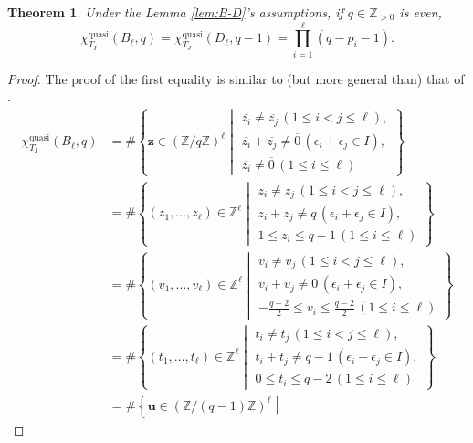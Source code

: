 \documentclass[12pt]{amsart}
\theoremstyle{plain}
\newtheorem{theorem}{Theorem}[section]
\theoremstyle{definition}
\theoremstyle{remark}
\newcommand{\Z}{\mathbb{Z}}
\newcommand{\quasi}{\operatorname{quasi}}
\begin{document}
\begin{theorem} \label{thm:B-and-D} 
Under the Lemma \ref{lem:B-D}'s assumptions, if $q \in \Z_{>0}$ is even, 
  \begin{equation*}\label{eq:B-D}
\chi^{\quasi}_{T_{I}}(B_\ell, q)=\chi^{\quasi}_{T_J}(D_\ell, q-1)= \prod_{i=1}^\ell (q-p_i-1).
\end{equation*}
\end{theorem}
\begin{proof} 
The proof of the first equality is similar to (but more general than) that of \cite[Lemma 4.4(11)]{KTT07}. 
\begin{align*}
\chi^{\quasi}_{T_I}(B_\ell, q) 
&=\# \left\{ \textbf{z}  \in   (\Z/q\Z)^\ell   \middle|
\begin{array}{c}
      \overline{z_i} \ne  \overline{z_j}\,(1 \le i <j \le \ell),  \\
      \overline{z_i} +  \overline{z_j}\ne \overline0\,(\epsilon_i+\epsilon_{j} \in I), \\
      \overline{z_i}\ne \overline0\,(1 \le i \le \ell)
    \end{array}
\right\} \\
&= \#\left\{(z_1,\ldots,z_\ell)  \in \Z^\ell  \middle|
\begin{array}{c}
     z_i \ne z_j \,(1 \le i <j \le \ell),  \\
      z_i +z_j \ne q\,(\epsilon_i+\epsilon_{j} \in I), \\
     1 \le z_i \le q-1\,(1 \le i \le \ell)
    \end{array}
\right\} \\
&= \#\left\{(v_1,\ldots,v_\ell)  \in \Z^\ell  \middle|
\begin{array}{c}
     v_i \ne v_j \,(1 \le i <j \le \ell),  \\ 
     v_i +v_j \ne 0\,(\epsilon_i+\epsilon_{j} \in I), \\
     -\frac{q-2}2 \le v_i \le \frac{q-2}2\,(1 \le i \le \ell)
    \end{array}
\right\} \\
&= \#\left\{(t_1,\ldots,t_\ell)  \in \Z^\ell  \middle|
\begin{array}{c}
     t_i \ne t_j\,(1 \le i <j \le \ell),  \\ 
t_i +t_j \ne q-1\,(\epsilon_i+\epsilon_{j} \in I), \\
     0 \le t_i \le q-2\,(1 \le i \le \ell)
    \end{array}
\right\} \\
&=\# \left\{ \textbf{u}  \in   (\Z/(q-1)\Z)^\ell   \middle|

\end{align*}
\end{proof}
\end{document}
